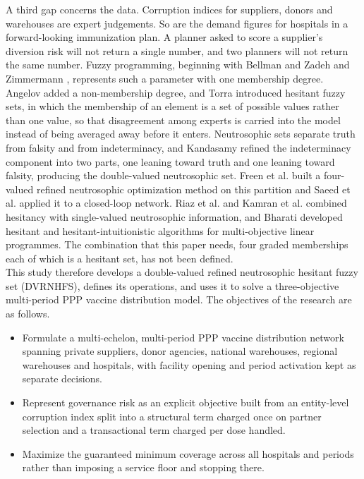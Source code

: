 \documentclass[a4paper]{elsarticle}
\begin{document}
{A third gap concerns the data. Corruption indices for suppliers, donors and warehouses are expert judgements. So are the demand figures for hospitals in a forward-looking immunization plan. A planner asked to score a supplier's diversion risk will not return a single number, and two planners will not return the same number. Fuzzy programming, beginning with Bellman and Zadeh \cite{Bellman:1970} and Zimmermann \cite{Zimmermann:1978} , represents such a parameter with one membership degree. Angelov \cite{Angelov:1997} added a non-membership degree, and Torra \cite{Torra:2010} introduced hesitant fuzzy sets, in which the membership of an element is a set of possible values rather than one value, so that disagreement among experts is carried into the model instead of being averaged away before it enters. Neutrosophic sets separate truth from falsity and from indeterminacy, and Kandasamy \cite{Kandasamy:2018} refined the indeterminacy component into two parts, one leaning toward truth and one leaning toward falsity, producing the double-valued neutrosophic set. Freen et al. \cite{Freen:2020} built a four-valued refined neutrosophic optimization method on this partition and Saeed et al. \cite{Saeed:2024} applied it to a closed-loop network. Riaz et al. \cite{Riaz:2022} and Kamran et al. \cite{Kamran:2023} combined hesitancy with single-valued neutrosophic information, and Bharati \cite{Bharati:2018,Bharati:2022} developed hesitant and hesitant-intuitionistic algorithms for multi-objective linear programmes. The combination that this paper needs, four graded memberships each of which is a hesitant set, has not been defined.\\
This study therefore develops a double-valued refined neutrosophic hesitant fuzzy set (DVRNHFS), defines its operations, and uses it to solve a three-objective multi-period PPP vaccine distribution model. The objectives of the research are as follows.
\begin{itemize}
    \item Formulate a multi-echelon, multi-period PPP vaccine distribution network spanning private suppliers, donor agencies, national warehouses, regional warehouses and hospitals, with facility opening and period activation kept as separate decisions.
    \item Represent governance risk as an explicit objective built from an entity-level corruption index split into a structural term charged once on partner selection and a transactional term charged per dose handled.
    \item Maximize the guaranteed minimum coverage across all hospitals and periods rather than imposing a service floor and stopping there.

\end{itemize}}
\end{document}
